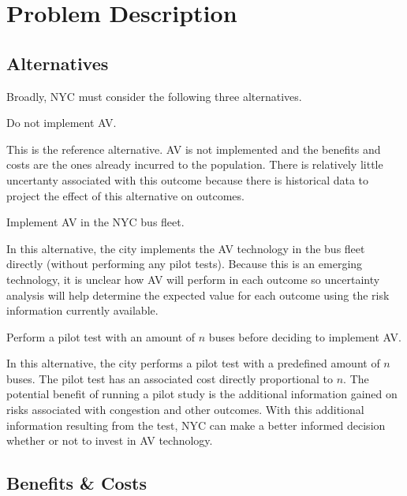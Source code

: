 \documentclass[11pt, letterpaper]{article}
\begin{document}
\section{Problem Description} \label{problem}
\subsection{Alternatives}

Broadly, NYC must consider the following three alternatives.

\begin{description}[leftmargin=0pt]
\item[Alternative 1:] Do not implement AV.

This is the reference alternative. AV is not implemented and the
benefits and costs are the ones already incurred to the population.
There is relatively little uncertanty associated with this outcome
because there is historical data to project the effect of this
alternative on outcomes.

\item[Alternative 2:] Implement AV in the NYC bus fleet.

In this alternative, the city implements the AV technology in the bus
fleet directly (without performing any pilot tests).  Because this is
an emerging technology, it is unclear how AV will perform in each
outcome so uncertainty analysis will help determine the expected value
for each outcome using the risk information currently available.

\item[Alternative 3:] Perform a pilot test with an amount of $n$ buses
  before deciding to implement AV.

In this alternative, the city performs a pilot test with a predefined
amount of $n$ buses. The pilot test has an associated cost directly
proportional to $n$.  The potential benefit of running a pilot study
is the additional information gained on risks associated with
congestion and other outcomes.  With this additional information
resulting from the test, NYC can make a better informed decision
whether or not to invest in AV technology.

\end{description}

\subsection{Benefits \& Costs}
\end{document}
